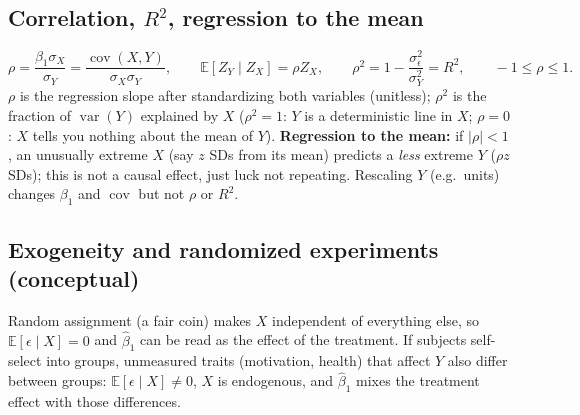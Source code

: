 \documentclass[11pt]{article}
\newcommand{\E}{\mathbb{E}}
\newcommand{\Var}{\operatorname{var}}
\newcommand{\Cov}{\operatorname{cov}}
\newcommand{\given}{\mid}
\begin{document}
\subsection{Correlation, $R^2$, regression to the mean}
\[
\rho=\frac{\beta_1\sigma_X}{\sigma_Y}=\frac{\Cov(X,Y)}{\sigma_X\sigma_Y},\qquad
\E[Z_Y\given Z_X]=\rho Z_X,\qquad
\rho^2=1-\frac{\sigma_\epsilon^2}{\sigma_Y^2}=R^2,\qquad -1\le\rho\le1 .
\]
$\rho$ is the regression slope after standardizing both variables (unitless); $\rho^2$ is the fraction of $\Var(Y)$ explained by $X$
($\rho^2=1$: $Y$ is a deterministic line in $X$; $\rho=0$: $X$ tells you nothing about the mean of $Y$).
\textbf{Regression to the mean:} if $|\rho|<1$, an unusually extreme $X$ (say $z$ SDs from its mean) predicts a \emph{less} extreme $Y$ ($\rho z$ SDs);
this is not a causal effect, just luck not repeating.
Rescaling $Y$ (e.g.\ units) changes $\beta_1$ and $\Cov$ but not $\rho$ or $R^2$.

\subsection{Exogeneity and randomized experiments (conceptual)}
Random assignment (a fair coin) makes $X$ independent of everything else, so $\E[\epsilon\given X]=0$ and $\hat\beta_1$ can be read as the effect of the treatment.
If subjects self-select into groups, unmeasured traits (motivation, health) that affect $Y$ also differ between groups: $\E[\epsilon\given X]\neq0$, $X$ is endogenous,
and $\hat\beta_1$ mixes the treatment effect with those differences.
\end{document}

